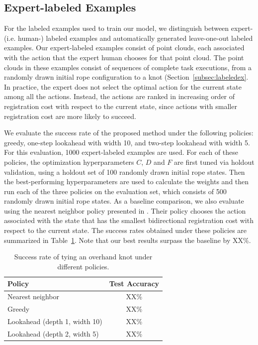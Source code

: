 \subsection{Expert-labeled Examples}
For the labeled examples  used to train our \mmql{} model, we distinguish between expert- (i.e. human-) labeled examples and automatically generated leave-one-out labeled examples.
Our expert-labeled examples consist of point clouds, each associated with the action that the expert human chooses for that point cloud.
The point clouds in these examples consist of sequences of complete task executions, from a randomly drawn initial rope configuration to a knot (Section~\ref{subsec:labeledex}.
In practice, the expert does not select the optimal action for the current state among all the actions.
Instead, the actions are ranked in increasing order of registration cost with respect to the current state, since actions with smaller registration cost are more likely to succeed.

We evaluate the success rate of the proposed method under the following policies: greedy, one-step lookahead with width 10, and two-step lookahead with width 5.
For this evaluation, 1000 expert-labeled examples are used.
For each of these policies, the optimization hyperparameters $C$, $D$ and $F$ are first tuned via holdout validation, using a holdout set of 100 randomly drawn initial rope states.
Then the best-performing hyperparameters are used to calculate the weights and then run each of the three policies on the evaluation set, which consists of 500 randomly drawn initial rope states.
As a baseline comparison, we also evaluate using the nearest neighbor policy presented in \citet{Schulmanetal_ISRR2013}.
Their policy chooses the action associated with the state that has the smallest bidirectional registration cost with respect to the current state.
The success rates obtained under these policies are summarized in Table~\ref{table:performance}. Note that our best results surpass the baseline by XX\%.

\begin{table}
  \centering
  \begin{tabular}{lc}
    \toprule
      Policy & Test Accuracy\\
    \midrule
      Nearest neighbor \cite{Schulmanetal_ISRR2013} & XX\% \\
    \midrule
      Greedy & XX\% \\
      Lookahead (depth 1, width 10) & XX\% \\
      Lookahead (depth 2, width 5) & XX\% \\
    \bottomrule
  \end{tabular}
  \caption{Success rate of tying an overhand knot under different policies.}
  \label{table:performance}
\end{table}

